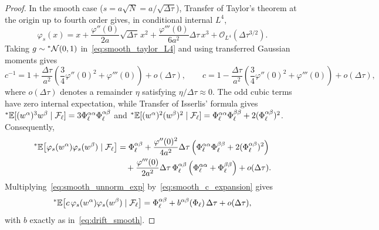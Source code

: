 \begin{proof}
In the smooth case ($s = a\sqrt{N} = a/\sqrt{\Delta\tau}$), Transfer of Taylor's theorem at the origin up to fourth order gives, in conditional internal $L^4$,
\begin{equation}\label{eq:smooth_taylor_L4}
\varphi_s(x) = x + \frac{\varphi''(0)}{2a}\sqrt{\Delta\tau}\,x^2 + \frac{\varphi'''(0)}{6a^2}\Delta\tau\,x^3 + \mathcal{O}_{L^4}(\Delta\tau^{3/2}).
\end{equation}
Taking $g \sim {}^*\mathcal{N}(0, 1)$ in~\eqref{eq:smooth_taylor_L4} and using transferred Gaussian moments gives
\begin{equation}\label{eq:smooth_c_expansion}
c^{-1} = 1 + \frac{\Delta\tau}{a^2}\left(\frac{3}{4}\varphi''(0)^2 + \varphi'''(0)\right) + o(\Delta\tau), \qquad c = 1 - \frac{\Delta\tau}{a^2}\left(\frac{3}{4}\varphi''(0)^2 + \varphi'''(0)\right) + o(\Delta\tau),
\end{equation}
where $o(\Delta\tau)$ denotes a remainder $\eta$ satisfying $\eta/\Delta\tau \approx 0$. The odd cubic terms have zero internal expectation, while Transfer of Isserlis' formula gives ${}^*\mathbb{E}[(w^\alpha)^3 w^\beta \mid \mathcal{F}_\ell] = 3\Phi_\ell^{\alpha\alpha}\Phi_\ell^{\alpha\beta}$ and ${}^*\mathbb{E}[(w^\alpha)^2(w^\beta)^2 \mid \mathcal{F}_\ell] = \Phi_\ell^{\alpha\alpha}\Phi_\ell^{\beta\beta} + 2(\Phi_\ell^{\alpha\beta})^2$. Consequently,
\begin{equation}\label{eq:smooth_unnorm_exp}
\begin{aligned}
{}^*\mathbb{E}\!\left[\varphi_s(w^\alpha)\varphi_s(w^\beta) \mid \mathcal{F}_\ell\right] &= \Phi_\ell^{\alpha\beta} + \frac{\varphi''(0)^2}{4a^2}\Delta\tau\left(\Phi_\ell^{\alpha\alpha}\Phi_\ell^{\beta\beta} + 2(\Phi_\ell^{\alpha\beta})^2\right) \\
&\quad + \frac{\varphi'''(0)}{2a^2}\Delta\tau\,\Phi_\ell^{\alpha\beta}\left(\Phi_\ell^{\alpha\alpha} + \Phi_\ell^{\beta\beta}\right) + o(\Delta\tau).
\end{aligned}
\end{equation}
Multiplying~\eqref{eq:smooth_unnorm_exp} by~\eqref{eq:smooth_c_expansion} gives
\begin{equation}\label{eq:smooth_norm_exp}
{}^*\mathbb{E}\!\left[c\,\varphi_s(w^\alpha)\varphi_s(w^\beta) \mid \mathcal{F}_\ell\right] = \Phi_\ell^{\alpha\beta} + b^{\alpha\beta}(\Phi_\ell)\,\Delta\tau + o(\Delta\tau),
\end{equation}
with $b$ exactly as in~\eqref{eq:drift_smooth}.


\end{proof}
